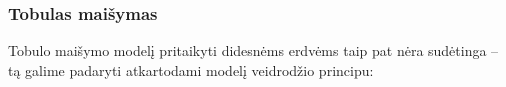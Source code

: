 \subsubsection*{Tobulas maišymas}

Tobulo maišymo modelį pritaikyti didesnėms erdvėms taip pat nėra sudėtinga -- tą galime padaryti atkartodami modelį veidrodžio principu:


